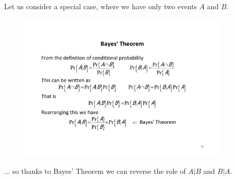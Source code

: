 \documentclass[notes=show,handout]{beamer}\usepackage[]{graphicx}\usepackage[]{color}
\newtheorem{aim}{Aim}[section]
\begin{document}
\begin{frame}{\secname}
  \begin{example}
  Let us consider a special case, where we have only two events $A$ and $B$.
  \begin{figure}[h!]
  \centering
  \includegraphics[width=0.9\textwidth,height=0.55\textheight]{img/example10.pdf}
  \end{figure}
  ... so thanks to Bayes' Theorem we can reverse the role of $A\vert B$ and $B \vert A$.
  \end{example}
\end{frame}

%
\end{document}
